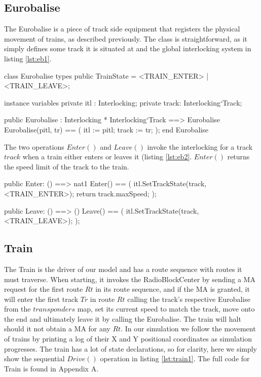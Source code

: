 \documentclass[preprint,12pt]{elsarticle}
\begin{document}
\subsection{Eurobalise}

The Eurobalise is a piece of track side equipment that registers the physical movement of trains, as described previously. The class is straightforward, as it simply defines some track it is situated at and the global interlocking system in listing \ref{lst:eb1}.

\begin{vdmsl}[label=lst:eb1,caption={Types, variables, constructor for the Eurobalise.}]
	class Eurobalise
	types
	public TrainState = <TRAIN_ENTER> | <TRAIN_LEAVE>;

	instance variables
	private itl : Interlocking;
	private track: Interlocking`Track;
	
	public Eurobalise : Interlocking * Interlocking`Track
 	==> Eurobalise
	Eurobalise(pitl, tr) ==
	(
		itl := pitl;
		track := tr;
	);
	end Eurobalise			
\end{vdmsl}

The two operations $Enter()$ and $Leave()$ invoke the interlocking for a track $track$ when a train either enters or leaves it (listing \ref{lst:eb2}. $Enter()$ returns the speed limit of the track to the train.

\begin{vdmsl}[label=lst:eb2,caption={The two operations that trains call to register their movement.}]
	public Enter: () ==> nat1
	Enter() == (
		itl.SetTrackState(track, <TRAIN_ENTER>);
		return track.maxSpeed;
	);
	
	public Leave: () ==> ()
	Leave() == (
		itl.SetTrackState(track, <TRAIN_LEAVE>);
	);	
\end{vdmsl}

\subsection{Train}

The Train is the driver of our model and has a route sequence with routes it must traverse. When starting, it invokes the RadioBlockCenter by sending a MA request for the first route $Rt$ in its route sequence, and if the MA is granted, it will enter the first track $Tr$ in route $Rt$ calling the track's respective Eurobalise from the $transponders$ map, set its current speed to match the track, move onto the end and ultimately leave it by calling the Eurobalise. The train will halt should it not obtain a MA for any $Rt$. In our simulation we follow the movement of trains by printing a log of their X and Y positional coordinates as simulation progresses. The train has a lot of state declarations, so for clarity, here we simply show the sequential $Drive()$ operation in listing \ref{lst:train1}. The full code for Train is found in Appendix A.
\end{document}
